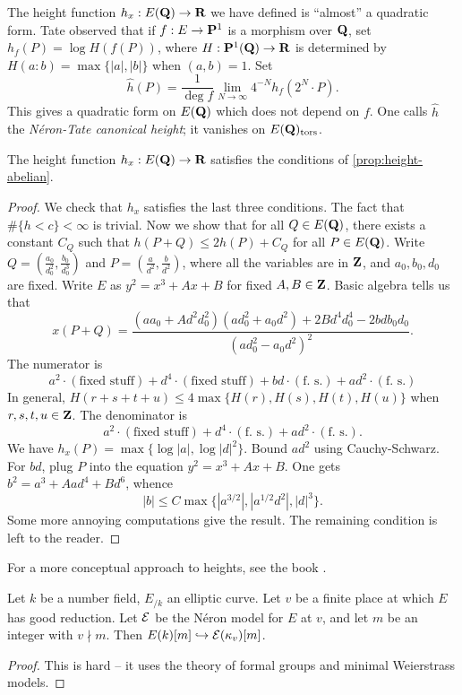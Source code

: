 The height function $h_x:E(\mathbf{Q})\to \mathbf{R}$ we have defined is ``almost'' a 
quadratic form. Tate observed that if $f:E\to \mathbf{P}^1$ is a morphism over $\mathbf{Q}$, 
set $h_f(P)=\log H(f(P))$, where $H:\mathbf{P}^1(\mathbf{Q})\to \mathbf{R}$ is determined by 
$H(a:b)=\max\{|a|,|b|\}$ when $(a,b)=1$. Set 
\[
  \widehat h(P)=\frac{1}{\deg f}\lim_{N\to \infty} 4^{-N} h_f(2^N\cdot P) .
\]
This gives a quadratic form on $E(\mathbf{Q})$ which does not depend on $f$. One 
calls $\widehat h$ the \emph{N\'eron-Tate canonical height}; it vanishes on 
$E(\mathbf{Q})_\mathrm{tors}$. 

\begin{proposition}
The height function $h_x:E(\mathbf{Q})\to \mathbf{R}$ satisfies the conditions of 
\autoref{prop:height-abelian}. 
\end{proposition}
\begin{proof}
We check that $h_x$ satisfies the last three conditions. The fact that 
$\#\{h<c\}<\infty$ is trivial. Now we show that for all 
$Q\in E(\mathbf{Q})$, there exists a constant $C_Q$ such that 
$h(P+Q)\leqslant 2 h(P)+C_Q$ for all $P\in E(\mathbf{Q})$. Write 
$Q=(\frac{a_0}{d_0^2},\frac{b_0}{d_0^3})$ and
$P=(\frac{a}{d^2},\frac{b}{d^2})$, where all the variables are in $\mathbf{Z}$, and 
$a_0,b_0,d_0$ are fixed. Write $E$ as $y^2=x^3+A x+B$ for fixed $A,B\in \mathbf{Z}$. 
Basic algebra tells us that 
\[
  x(P+Q) = \frac{(a a_0+A d^2 d_0^2)(a d_0^2+a_0 d^2) + 2 B d^4 d_0^4 - 2 b d b_0 d_0}{(a d_0^2-a_0 d^2)^2} .
\]
The numerator is 
\[
  a^2\cdot (\text{fixed stuff}) + d^4\cdot(\text{fixed stuff}) + b d\cdot(\text{f.~s.}) + a d^2\cdot (\text{f.~s.}) 
\]
In general, $H(r+s+t+u)\leqslant 4\max\{H(r),H(s),H(t),H(u)\}$ when 
$r,s,t,u\in \mathbf{Z}$. The denominator is 
\[
  a^2\cdot (\text{fixed stuff})+d^4\cdot (\text{f.~s.})+a d^2\cdot(\text{f.~s.}) .
\]
We have $h_x(P)=\max\{\log|a|,\log|d|^2\}$. Bound $a d^2$ using Cauchy-Schwarz. 
For $b d$, plug $P$ into the equation $y^2=x^3+A x+B$. One gets 
$b^2=a^3+A ad^4 + B d^6$, whence 
\[
  |b|\leqslant C\max\{|a^{3/2}|,|a^{1/2} d^2|,|d|^3\} .
\]
Some more annoying computations give the result. 
The remaining condition is left to the reader. 
\end{proof}

For a more conceptual approach to heights, see the book 
\cite{bombieri-gubler-2006}. 

\begin{proposition}
Let $k$ be a number field, $E_{/k}$ an elliptic curve. Let $v$ be a finite place 
at which $E$ has good reduction. Let $\mathcal{E}$ be the N\'eron model for $E$ at $v$, and 
let $m$ be an integer with $v\nmid m$. Then $E(k)[m]\hookrightarrow \mathcal{E}(\kappa_v)[m]$. 
\end{proposition}
\begin{proof}
This is hard -- it uses the theory of formal groups and minimal Weierstrass 
models. 
\end{proof}

